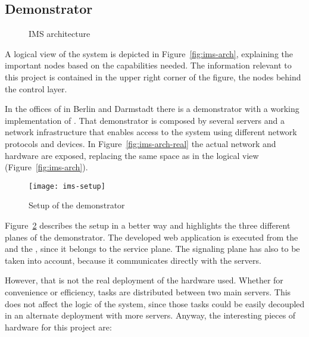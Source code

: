 \subsection{ Demonstrator} %
\label{sub:demonstrator}

\begin{figure}[htbp]
  \centering
  \label{fig:ims}
  \caption{IMS architecture}
\end{figure}

A logical view of the system is depicted in Figure~\ref{fig:ims-arch}, explaining the important nodes based on the capabilities needed.
The information relevant to this project is contained in the upper right corner of the figure, the nodes behind the control layer.

In the offices of  in Berlin and Darmstadt there is a demonstrator with a working implementation of .
That demonstrator is composed by several servers and a network infrastructure that enables access to the system using different network protocols and devices.
In Figure~\ref{fig:ims-arch-real} the actual network and hardware are exposed, replacing the same space as in the logical view (Figure~\ref{fig:ims-arch}).

\begin{figure}[htbp]
  \centering
    \texttt{[image: ims-setup]}
  \caption{Setup of the demonstrator}
  \label{fig:ims-setup}
\end{figure}

Figure~\ref{fig:ims-setup} describes the setup in a better way and highlights the three different planes of the demonstrator.
The developed web application is executed from the  and the , since it belongs to the service plane.
The signaling plane has also to be taken into account, because it communicates directly with the servers.

However, that is not the real deployment of the hardware used.
Whether for convenience or efficiency, tasks are distributed between two main servers.
This does not affect the logic of the system, since those tasks could be easily decoupled in an alternate deployment with more servers.
Anyway, the interesting pieces of hardware for this project are:

